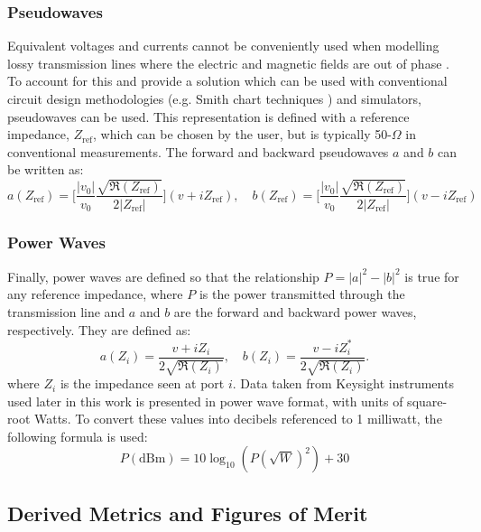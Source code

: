 \documentclass[../thesis/thesis.tex]{subfiles}
\begin{document}
\subsubsection{Pseudowaves}

Equivalent voltages and currents cannot be conveniently used when modelling lossy transmission lines where the electric and magnetic fields are out of phase \cite{Williams_1990}. To account for this and provide a solution which can be used with conventional circuit design methodologies (e.g. Smith chart techniques \cite{Smith_1939}) and simulators, pseudowaves can be used. This representation is defined with a reference impedance, $Z_\textrm{ref}$, which can be chosen by the user, but is typically 50-$\Omega$ in conventional measurements. The forward and backward pseudowaves $a$ and $b$ can be written as:
\begin{equation}
a(Z_\textrm{ref})=\bigg[\dfrac{|v_0|}{v_0}\dfrac{\sqrt{\Re(Z_\textrm{ref})}}{2|Z_\textrm{ref}|}\bigg](v+iZ_\textrm{ref}),\quad b(Z_\textrm{ref})=\bigg[\dfrac{|v_0|}{v_0}\dfrac{\sqrt{\Re(Z_\textrm{ref})}}{2|Z_\textrm{ref}|}\bigg](v-iZ_\textrm{ref})
\end{equation}

\subsubsection{Power Waves}

Finally, power waves are defined so that the relationship $P = |a|^2 - |b|^2$ is true for any reference impedance, where $P$ is the power transmitted through the transmission line and $a$ and $b$ are the forward and backward power waves, respectively. They are defined as:
\begin{equation}
a(Z_i)=\dfrac{v+iZ_i}{2\sqrt{\Re(Z_i)}},\quad b(Z_i)=\dfrac{v-iZ_i^*}{2\sqrt{\Re(Z_i)}}.
\end{equation}
where $Z_i$ is the impedance seen at port $i$. Data taken from Keysight instruments used later in this work is presented in power wave format, with units of square-root Watts. To convert these values into decibels referenced to 1 milliwatt, the following formula is used:
\begin{equation}
P(\textrm{dBm}) = 10\log_{10}(P(\sqrt{W})^2) + 30
\end{equation}

\subsection{Derived Metrics and Figures of Merit}
\end{document}
